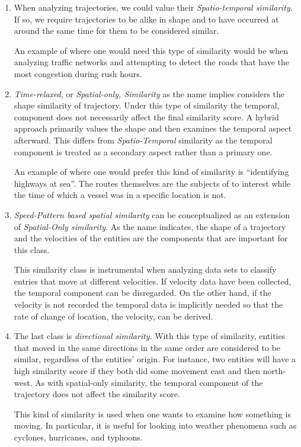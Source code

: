 \begin{enumerate}
\item When analyzing trajectories, we could value their \textit{Spatio-temporal similarity}. 
If so,  we require trajectories to be alike in shape and to have occurred at around the same time for them to be considered similar. 
\medskip

An example of where one would need this type of similarity would be when analyzing traffic networks and attempting to detect the roads that have the most congestion during rush hours. 

\medskip 
\item \textit{Time-relaxed}, or \textit{Spatial-only, Similarity} as the name implies considers the shape similarity of trajectory. 
Under this type of similarity the temporal, component does not necessarily affect the final similarity score. 
A hybrid approach primarily values the shape and then examines the temporal aspect afterward.
This differs from \textit{Spatio-Temporal} similarity as the temporal component is treated as a secondary aspect rather than a primary one. 
\medskip

An example of where one would prefer this kind of similarity is “identifying highways at sea”. 
The routes themselves are the subjects of  to interest while the time of which a vessel was in a specific location is not.


\medskip
\item \textit{Speed-Pattern based spatial similarity} can be conceptualized as an extension of \textit{Spatial-Only similarity}.
As the name indicates, the shape of a trajectory and the velocities of the entities are the components that are important for this class.
\medskip

This similarity class is instrumental when analyzing data sets to classify entries that move at different velocities. 
If velocity data have been collected, the temporal component can be disregarded. On the other hand, if the velocity is not recorded the temporal data is implicitly needed so that the rate of change of location, the velocity, can be derived. 


\medskip
\item The last class is \textit{directional similarity}. 
With this type of similarity, entities that moved in the same directions in the same order are considered to be similar, regardless of the entities' origin. For instance, two entities will have a high similarity score if they both did some movement east and then north-west. 
As with spatial-only similarity, the temporal component of the trajectory does not affect the similarity score. 

\medskip
This kind of similarity is used when one wants to examine how something is moving. In particular, it is useful for looking into weather phenomena such as cyclones, hurricanes, and typhoons.  

\end{enumerate}

